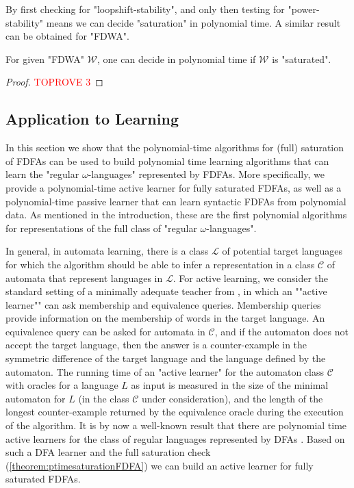 \documentclass[a4paper,USenglish,cleveref,autoref,thm-restate]{lipics-v2021}
\newcommand{\mc}[1]{\ensuremath{\mathcal{#1}}}
\newcommand{\C}{\mc{C}}
\renewcommand{\L}{\mc{L}}
\newcommand{\W}{\mc{W}}
\begin{document}
By first checking for "loopshift-stability", and only then testing for "power-stability" means we can decide "saturation" in polynomial time.
A similar result can be obtained for "FDWA".

\begin{theorem}
  For given "FDWA" $\W$, one can decide in polynomial time if $\W$ is "saturated".
  \label{theorem:ptimesaturationFDWA}
\end{theorem}
\begin{proof}\textcolor{red}{TOPROVE 3}\end{proof} \subsection{Application to Learning}\label{sec:learning}
In this section we show that the polynomial-time algorithms for (full) saturation of FDFAs can be used to build polynomial time learning algorithms that can learn the "regular $\omega$-languages" represented by FDFAs.
More specifically, we provide a polynomial-time active learner for fully saturated FDFAs, as well as a polynomial-time passive learner that can learn syntactic FDFAs from polynomial data.
As mentioned in the introduction, these are the first polynomial algorithms for representations of the full class of "regular $\omega$-languages".

In general, in automata learning, there is a class $\L$ of potential target languages for which the algorithm should be able to infer a representation in a class $\C$ of automata that represent languages in $\L$. 
\AP
For active learning, we consider the standard setting of a minimally adequate teacher from \cite{Angluin87}, in which an ""active learner"" can ask membership and equivalence queries. 
Membership queries provide information on the membership of words in the target language. An equivalence query can be asked for automata in $\C$, and if the automaton does not accept the target language, then the answer is a counter-example in the symmetric difference of the target language and the language defined by the automaton.
The running time of an "active learner" for the automaton class $\C$ with oracles for a language $L$ as input is measured in the size of the minimal automaton for $L$ (in the class $\C$ under consideration), and the length of the longest counter-example returned by the equivalence oracle during the execution of the algorithm. 
It is by now a well-known result that there are polynomial time active learners for the class of regular languages represented by DFAs \cite{Angluin87,RivestS93,KearnsV94}. Based on such a DFA learner and the full saturation check (\cref{theorem:ptimesaturationFDFA}) we can build an active learner for fully saturated FDFAs.
\end{document}
